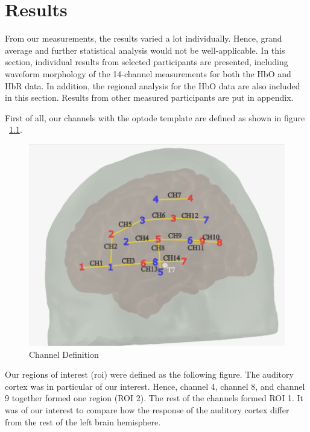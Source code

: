 \chapter{Results}

From our measurements, the results varied a lot individually. Hence, grand average and further statistical analysis would not be well-applicable. In this section, individual results from selected participants are presented, including waveform morphology of the 14-channel measurements for both the HbO and HbR data. In addition, the regional analysis for the HbO data are also included in this section. Results from other measured participants are put in appendix.

First of all, our channels with the optode template are defined as shown in figure ~\ref{fig:ChannelDef}.

\begin{figure}[H]
  \centering
    \includegraphics[scale=.45]{bilder/optode_ink.png}
  \caption{Channel Definition}
  \label{fig:ChannelDef}
\end{figure}


Our regions of interest (\acrshort{roi}) were defined as the following figure. The auditory cortex was in particular of our interest. Hence, channel 4, channel 8, and channel 9 together formed one region (ROI 2). The rest of the channels formed ROI 1. It was of our interest to compare how the response of the auditory cortex differ from the rest of the left brain hemisphere.


